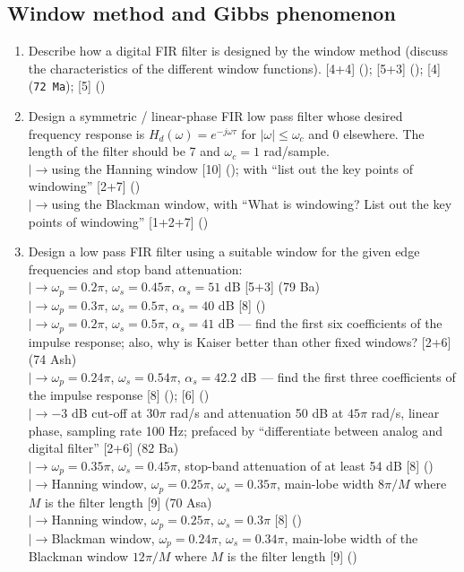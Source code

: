 \documentclass[12pt]{article}
\newcommand{\lb}{\\$\left|\rightarrow\right.$}
\begin{document}
  \subsection{Window method and Gibbs phenomenon}
    \begin{enumerate}[topsep=0pt, noitemsep]
      \item Describe how a digital FIR filter is designed by the window method (discuss the characteristics of the different window functions). \hfill [4+4] (); [5+3] (); [4] (\texttt{72 Ma}); [5] ()

      \item Design a symmetric / linear-phase FIR low pass filter whose desired frequency response is $H_d(\omega)=e^{-j\omega\tau}$ for $|\omega|\le\omega_c$ and $0$ elsewhere. The length of the filter should be 7 and $\omega_c=1$ rad/sample.
        \lb using the Hanning window \hfill [10] (); with ``list out the key points of windowing'' \hfill [2+7] ()
        \lb using the Blackman window, with ``What is windowing? List out the key points of windowing'' \hfill [1+2+7] ()

      \item Design a low pass FIR filter using a suitable window for the given edge frequencies and stop band attenuation:
        \lb $\omega_p=0.2\pi$, $\omega_s=0.45\pi$, $\alpha_s=51$ dB \hfill [5+3] (79 Ba)
        \lb $\omega_p=0.3\pi$, $\omega_s=0.5\pi$, $\alpha_s=40$ dB \hfill [8] ()
        \lb $\omega_p=0.2\pi$, $\omega_s=0.5\pi$, $\alpha_s=41$ dB --- find the first six coefficients of the impulse response; also, why is Kaiser better than other fixed windows? \hfill [2+6] (74 Ash)
        \lb $\omega_p=0.24\pi$, $\omega_s=0.54\pi$, $\alpha_s=42.2$ dB --- find the first three coefficients of the impulse response \hfill [8] (); [6] ()
        \lb $-3$ dB cut-off at $30\pi$ rad/s and attenuation 50 dB at $45\pi$ rad/s, linear phase, sampling rate 100 Hz; prefaced by ``differentiate between analog and digital filter'' \hfill [2+6] (82 Ba)
        \lb $\omega_p=0.35\pi$, $\omega_s=0.45\pi$, stop-band attenuation of at least 54 dB \hfill [8] ()
        \lb Hanning window, $\omega_p=0.25\pi$, $\omega_s=0.35\pi$, main-lobe width $8\pi/M$ where $M$ is the filter length \hfill [9] (70 Asa)
        \lb Hanning window, $\omega_p=0.25\pi$, $\omega_s=0.3\pi$ \hfill [8] ()
        \lb Blackman window, $\omega_p=0.24\pi$, $\omega_s=0.34\pi$, main-lobe width of the Blackman window $12\pi/M$ where $M$ is the filter length \hfill [9] ()


\end{enumerate}
\end{document}
